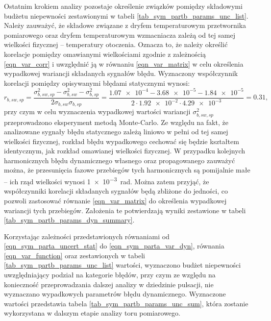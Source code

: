 Ostatnim krokiem analizy pozostaje określenie związków pomiędzy składowymi budżetu niepewności zestawionymi w tabeli \ref{tab_sym_partb_params_unc_list}. Należy zauważyć, że składowe związane z dryfem temperaturowym przetwornika pomiarowego oraz dryfem temperaturowym wzmacniacza zależą od tej samej wielkości fizycznej -- temperatury otoczenia. Oznacza to, że należy określić korelacje pomiędzy omawianymi wielkościami zgodnie z zależnością \eqref{eqn_var_corr} i uwzględnić ją w równaniu \eqref{eqn_var_matrix} w celu określenia wypadkowej wariancji składanych sygnałów błędu. Wyznaczony współczynnik korelacji pomiędzy opisywanymi błędami statycznymi wynosi:
\begin{equation}
r_{b,sw,sp} = \frac{\sigma_{b,sw,sp}^{2} - \sigma_{b,sw}^{2} - \sigma_{b,sp}^{2}}{2 \sigma_{b,sw} \sigma_{b,sp}} = \frac{\num{1.07e-4} - \num{3.68e-5} - \num{1.84e-5}}{2 \cdot \num{1.92e-2} \cdot \num{4.29e-3}} = 0.31 \label{eqn_sym_partb_stat_corr},
\end{equation}
przy czym w celu wyznaczenia wypadkowej wartości wariancji $\sigma_{b,sw,sp}^{2}$ przeprowadzono eksperyment metodą Monte-Carlo. Ze względu na fakt, że analizowane sygnały błędu statycznego zależą liniowo w pełni od tej samej wielkości fizycznej, rozkład błędu wypadkowego cechować się będzie kształtem identycznym, jak rozkład omawianej wielkości fizycznej. W przypadku kolejnych harmonicznych błędu dynamicznego własnego oraz propagowanego zauważyć można, że przesunięcia fazowe przebiegów tych harmonicznych są pomijalnie małe -- ich rząd wielkości wynosi \qty{1e-3}{rad}. Można zatem przyjąć, że współczynniki korelacji składanych sygnałów będą zbliżone do jedności, co pozwoli zastosować równanie \eqref{eqn_var_matrix} do określenia wypadkowej wariancji tych przebiegów. Założenia te potwierdzają wyniki zestawione w tabeli \ref{tab_sym_partb_params_dyn_summary}.

Korzystając zależności przedstawionych równaniami od \eqref{eqn_sym_parta_uncert_stat} do \eqref{eqn_sym_parta_var_dyn}, równania \eqref{eqn_var_function} oraz zestawionych w tabeli \ref{tab_sym_partb_params_unc_list} wartości, wyznaczono budżet niepewności uwzględniający podział na kategorie błędów, przy czym ze względu na konieczność przeprowadzania dalszej analizy w dziedzinie pulsacji, nie wyznaczano wypadkowych parametrów błędu dynamicznego. Wyznaczone wartości przedstawia tabela \ref{tab_sym_partb_params_unc_sum}, która zostanie wykorzystana w dalszym etapie analizy toru pomiarowego.

